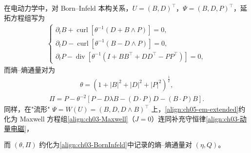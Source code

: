 \documentclass[../../main.tex]{subfiles}
\begin{document}
在电动力学中，对 Born--Infeld 本构关系，$U=(B,D)^{\top}$，$\Psi=(B,D,P)^{\top}$，延拓方程组写为
\begin{align}
\begin{cases}
\partial_{t}B+\operatorname{curl}[\theta^{-1}(D+B\wedge P)]=0,\\
\partial_{t}D-\operatorname{curl}[\theta^{-1}(B-D\wedge P)]=0,\\
\partial_{t}P-\operatorname{div}[\theta^{-1}(I+BB^{\top}+DD^{\top}-PP^{\top})]=0,
\end{cases}\label{align:ch05-em-extended}
\end{align}
而熵--熵通量对为
\begin{align}
\theta=(1+|B|^{2}+|D|^{2}+|P|^{2})^{\frac{1}{2}},\label{align:ch05-em-theta}
\end{align}
\begin{align}
\Pi=P-\theta^{-2}[P-D\lambda B-(D\cdot P)D-(B\cdot P)B].\label{align:ch05-em-Pi}
\end{align}
同样，在"流形" $\Psi=W(U)=(B,D,D\wedge B)^{\top}$ 上，\eqref{align:ch05-em-extended}约化为 Maxwell 方程组\eqref{align:ch03-Maxwell}（$J=0$）连同补充守恒律\eqref{align:ch03-动量电磁}，

而 $(\theta,\Pi)$ 约化为\eqref{align:ch03-BornInfeld}中记录的熵--熵通量对 $(\eta,Q)$。
\end{document}
